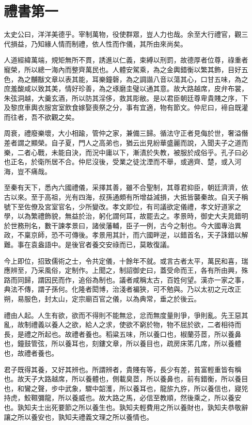 \chapter{禮書第一}

太史公曰，洋洋美德乎。宰制萬物，役使群眾，豈人力也哉。余至大行禮官，觀三代損益，乃知緣人情而制禮，依人性而作儀，其所由來尚矣。

人道經緯萬端，規矩無所不貫，誘進以仁義，束縛以刑罰，故德厚者位尊，祿重者寵榮，所以總一海內而整齊萬民也。人體安駕乘，為之金輿錯衡以繁其飾，目好五色，為之黼黻文章以表其能，耳樂鐘磬，為之調諧八音以蕩其心，口甘五味，為之庶羞酸咸以致其美，情好珍善，為之琢磨圭璧以通其意。故大路越席，皮弁布裳，朱弦洞越，大羹玄酒，所以防其淫侈，救其彫敝。是以君臣朝廷尊卑貴賤之序，下及黎庶車輿衣服宮室飲食嫁娶喪祭之分，事有宜適，物有節文。仲尼曰，褅自既灌而往者，吾不欲觀之矣。

周衰，禮廢樂壞，大小相踰，管仲之家，兼備三歸。循法守正者見侮於世，奢溢僭差者謂之顯榮。自子夏，門人之高弟也，猶云出見紛華盛麗而說，入聞夫子之道而樂，二者心戰，未能自決，而況中庸以下，漸漬於失教，被服於成俗乎。孔子曰必也正名，於衛所居不合。仲尼沒後，受業之徒沈湮而不舉，或適齊、楚，或入河海，豈不痛哉。

至秦有天下，悉內六國禮儀，采擇其善，雖不合聖制，其尊君抑臣，朝廷濟濟，依古以來。至于高祖，光有四海，叔孫通頗有所增益減損，大抵皆襲秦故。自天子稱號下至佐僚及宮室官名，少所變改。孝文即位，有司議欲定儀禮，孝文好道家之學，以為繁禮飾貌，無益於治，躬化謂何耳，故罷去之。孝景時，御史大夫晁錯明於世務刑名，數干諫孝景曰，諸侯藩輔，臣子一例，古今之制也。今大國專治異政，不稟京師，恐不可傳後。孝景用其計，而六國畔逆，以錯首名，天子誅錯以解難。事在袁盎語中。是後官者養交安祿而已，莫敢復議。

今上即位，招致儒術之士，令共定儀，十餘年不就。或言古者太平，萬民和喜，瑞應辨至，乃采風俗，定制作。上聞之，制詔御史曰，蓋受命而王，各有所由興，殊路而同歸，謂因民而作，追俗為制也。議者咸稱太古，百姓何望。漢亦一家之事，典法不傳，謂子孫何。化隆者閎博，治淺者褊狹，可不勉與。乃以太初之元改正朔，易服色，封太山，定宗廟百官之儀，以為典常，垂之於後云。

禮由人起。人生有欲，欲而不得則不能無忿，忿而無度量則爭，爭則亂。先王惡其亂，故制禮義以養人之欲，給人之求，使欲不窮於物，物不屈於欲，二者相待而長，是禮之所起也。故禮者養也。稻粱五味，所以養口也，椒蘭芬茝，所以養鼻也，鐘鼓管弦，所以養耳也，刻鏤文章，所以養目也，疏房床笫几席，所以養體也，故禮者養也。

君子既得其養，又好其辨也。所謂辨者，貴賤有等，長少有差，貧富輕重皆有稱也。故天子大路越席，所以養體也，側載臭茝，所以養鼻也，前有錯衡，所以養目也，和鸞之聲，步中武象，驟中韶濩，所以養耳也，龍旂九斿，所以養信也，寢兕持虎，鮫韅彌龍，所以養威也。故大路之馬，必信至教順，然後乘之，所以養安也。孰知夫士出死要節之所以養生也。孰知夫輕費用之所以養財也，孰知夫恭敬辭讓之所以養安也，孰知夫禮義文理之所以養情也。

